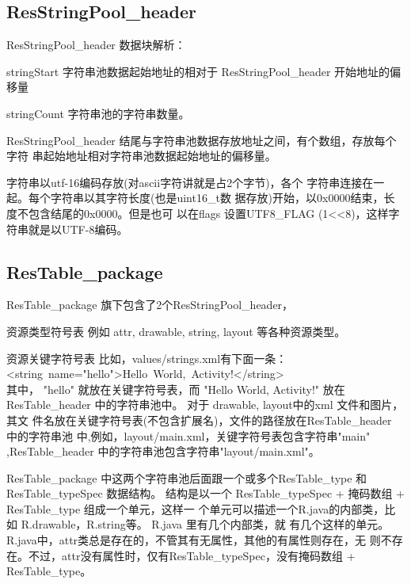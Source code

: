 \documentclass[a4paper,11pt]{article}
\begin{document}
\subsection{ResStringPool_header}
ResStringPool_header 数据块解析：
\begin{itemize*}
    \item stringStart 字符串池数据起始地址的相对于 ResStringPool_header 开始地址的偏移量
    \item stringCount 字符串池的字符串数量。
\end{itemize*}

ResStringPool_header 结尾与字符串池数据存放地址之间，有个数组，存放每个字符
串起始地址相对字符串池数据起始地址的偏移量。

字符串以utf-16编码存放(对ascii字符讲就是占2个字节)，各个
字符串连接在一起。每个字符串以其字符长度(也是uint16_t数
据存放)开始，以0x0000结束，长度不包含结尾的0x0000。但是也可
以在flags 设置UTF8_FLAG (1<<8)，这样字符串就是以UTF-8编码。

 \subsection{ResTable_package}
ResTable_package 旗下包含了2个ResStringPool_header，
\begin{description*}
    \item [资源类型\label{restype}符号表] 例如 attr, drawable, string, layout 等各种资源类型。
    \item [资源关键字符号表] 比如，values/strings.xml有下面一条： 
        \\\hbox{<string name="hello">Hello World, Activity!</string>}\\
        其中， "hello" 就放在关键字符号表，而 "Hello World, Activity!" 放在
        ResTable_header 中的字符串池中。 对于 drawable, layout中的xml 文件和图片，其文
        件名放在关键字符号表(不包含扩展名)，文件的路径放在ResTable_header 中的字符串池
        中,例如，layout/main.xml，关键字符号表包含字符串"main" ,ResTable_header 
        中的字符串池包含字符串"layout/main.xml"。
\end{description*}
ResTable_package 中这两个字符串池后面跟一个或多个ResTable_type 
和 ResTable_typeSpec 数据结构。
结构是以一个 ResTable_typeSpec + 掩码数组 + ResTable_type 组成一个单元，这样一
个单元可以描述一个R.java的内部类，比如 R.drawable，R.string等。 R.java 里有几个内部类，就
有几个这样的单元。R.java中，attr类总是存在的，不管其有无属性，其他的有属性则存在，无
则不存在。不过，attr没有属性时，仅有ResTable_typeSpec，没有掩码数组 + ResTable_type。
\end{document}
